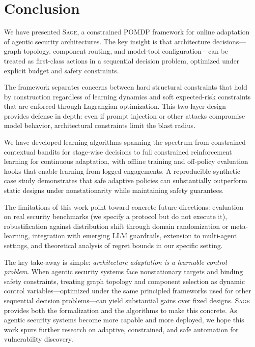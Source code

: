 \documentclass[sigconf,anonymous]{acmart}
\newcommand{\SAGE}{\textsc{Sage}\xspace}
\begin{document}
\section{Conclusion}
\label{sec:conclusion}

We have presented \SAGE, a constrained POMDP framework for online adaptation of agentic security architectures. The key insight is that architecture decisions---graph topology, component routing, and model-tool configuration---can be treated as first-class actions in a sequential decision problem, optimized under explicit budget and safety constraints.

The framework separates concerns between hard structural constraints that hold by construction regardless of learning dynamics and soft expected-risk constraints that are enforced through Lagrangian optimization. This two-layer design provides defense in depth: even if prompt injection or other attacks compromise model behavior, architectural constraints limit the blast radius.

We have developed learning algorithms spanning the spectrum from constrained contextual bandits for stage-wise decisions to full constrained reinforcement learning for continuous adaptation, with offline training and off-policy evaluation hooks that enable learning from logged engagements. A reproducible synthetic case study demonstrates that safe adaptive policies can substantially outperform static designs under nonstationarity while maintaining safety guarantees.

The limitations of this work point toward concrete future directions: evaluation on real security benchmarks (we specify a protocol but do not execute it), robustification against distribution shift through domain randomization or meta-learning, integration with emerging LLM guardrails, extension to multi-agent settings, and theoretical analysis of regret bounds in our specific setting.

The key take-away is simple: \emph{architecture adaptation is a learnable control problem}. When agentic security systems face nonstationary targets and binding safety constraints, treating graph topology and component selection as dynamic control variables---optimized under the same principled frameworks used for other sequential decision problems---can yield substantial gains over fixed designs. \SAGE provides both the formalization and the algorithms to make this concrete. As agentic security systems become more capable and more deployed, we hope this work spurs further research on adaptive, constrained, and safe automation for vulnerability discovery.
\end{document}
